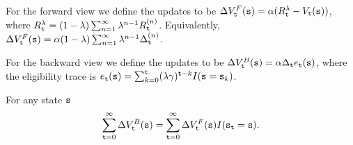 For the forward view we define the updates to be
$\Delta V^F_{\tt t}({\tt s})=\alpha(R^\lambda_{\tt t}-V_{\tt t}({\tt s}))$,
where $R^\lambda_{\tt t}=(1-\lambda)\sum_{n=1}^\infty
\lambda^{n-1}R_{\tt t}^{(n)}$. Equivalently,
$\Delta V^F_{\tt t}({\tt s})=\alpha (1-\lambda)\sum_{n=1}^\infty \lambda^{n-1}\Delta_{\tt t} ^{(n)}$.


For the backward view we define the updates to be
$\Delta V^B_{\tt t}({\tt s})=\alpha\Delta_{\tt t} e_{\tt t}({\tt s})$,
where the eligibility trace is
$e_{\tt t}({\tt s})=\sum_{k=0}^{\tt t}(\lambda\gamma)^{{\tt t}-k}I({\tt s}={\tt s}_k)$.

\begin{theorem}
For any state ${\tt s}$
\[
\sum_{{\tt t}=0}^{\infty} \Delta V^B_{\tt t}
({\tt s})=\sum_{{\tt t}=0}^{\infty} \Delta V_{\tt t}^F({\tt s})
I({\tt s}_{\tt t}={\tt s}).
\]
\end{theorem}

